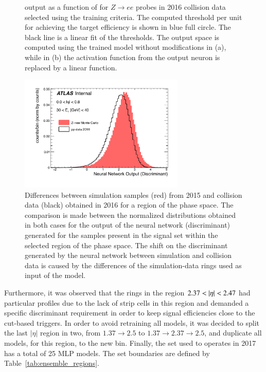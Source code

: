 \begin{figure}[h!tb]
\begin{center}
\begin{subfigure}[c]{.48\textwidth}
  \label{fig:nn_correction_without_tansig}
  \end{subfigure}
  \caption{
    \rnn output as a function of \avgmu{} for $Z\rightarrow ee$ probes in 
    2016 collision data selected using the training criteria.
    The computed threshold per \avgmu{} unit for achieving the target 
    efficiency is shown in blue full circle. The black line is a linear fit of the thresholds.
    The output space is computed using the trained model without modifications 
    in (a), while in (b) the activation function from the output neuron is replaced by a linear function.
  }%
  \end{center}
\end{figure}

\begin{figure}[!ht]
  \centering
  \includegraphics[width=0.7\textwidth]{sections/02_ringer/figures/nn_output_mc15_versus_data16_et2_eta0.pdf}
  \caption{Differences between simulation samples (red) from 2015 and collision data (black) obtained in 2016 for a region of the phase space.
  The comparison is made between the normalized distributions obtained in both cases for the output of the neural network (discriminant) generated for the samples present in the signal set within the selected region of the phase space. The shift on the discriminant generated by the neural network between simulation and collision data is caused by the differences of the simulation-data rings used as input of the model. }
  \label{fig:nn_mc15_vs_data16}
\end{figure}


Furthermore, it was observed
that the rings in the region $2.37<\abseta<2.47$ had particular profiles due to
the lack of strip cells in this region and demanded a specific discriminant requirement in order to keep signal efficiencies close to the cut-based triggers. In order to avoid retraining all models, it was decided to split the last $|\eta|$ region in two, from $1.37\rightarrow 2.5$ to $1.37\rightarrow2.37\rightarrow2.5$, and duplicate all models, for this region, to the new bin. Finally, the set used to operates in 2017 has a total of 25 MLP models. The set boundaries are defined by Table~\ref{tab:ensemble_regions}.

